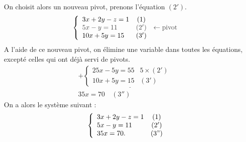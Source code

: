                               On choisit alors un nouveau pivot, prenons l'\'equation $(2')$.
                              \[
                                    \left\lbrace
	                                    \begin{array}{lcl}
	                                          3 x + 2 y -   z =   1  & (1) &            \\
	                                          \textcolor{loko1}{5 x - y = 11}  
	                                                & \textcolor{loko1}{(2')} 
	                                                      & \textcolor{loko1}{\leftarrow \text{pivot}} \\
	                                          10 x + 5 y = 15 & (3') &
	                                    \end{array}
                                    \right.
                              \]
                              A l'aide de ce nouveau pivot, on \'elimine une variable dans toutes les \'equations,
                              except\'e celles qui ont d\'ej\`a servi de pivots.
                              \[
                                    \begin{matrix}
	                                          +
                                          \underline{
		                                    \left\lbrace
			                                    \begin{array}{lcl}
			                                          25 x - 5 y = 55 & 5\times(2') & \\
			                                          10 x + 5 y = 15 & (3') &  
			                                    \end{array}
		                                    \right.
		                                    }
                                                \\
                                                            35 x        = 70      \quad (3'')
                                    \end{matrix}
                              \]
                              On a alors le syst\`eme suivant : 
                              \[
                                    \left\lbrace
	                                    \begin{array}{lc}
	                                           3 x + 2 y -   z =   1  & (1 )  \\
	                                           5 x -   y       =  11  & (2') \\
	                                          35 x             =  70. & (3") \\
	                                    \end{array}
                                    \right.
                              \]
